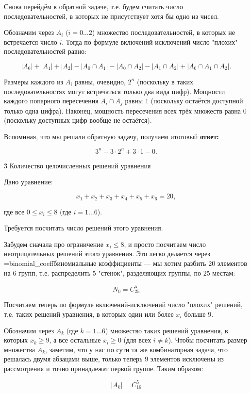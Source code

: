 Снова перейдём к обратной задаче, т.е. будем считать число последовательностей, в которых не присутствует хотя бы одно из чисел.

Обозначим через $A_i$ ($i = 0 \ldots 2$) множество последовательностей, в которых не встречается число $i$. Тогда по формуле включений-исключений число "плохих" последовательностей равно:

$$ |A_0| + |A_1| + |A_2| - |A_0 \cap A_1| - |A_0 \cap A_2| - |A_1 \cap A_2| + |A_0 \cap A_1 \cap A_2|. $$

Размеры каждого из $A_i$ равны, очевидно, $2^n$ (поскольку в таких последовательностях могут встречаться только два вида цифр). Мощности каждого попарного пересечения $A_i \cap A_j$ равны $1$ (поскольку остаётся доступной только одна цифра). Наконец, мощность пересечения всех трёх множеств равна $0$ (поскольку доступных цифр вообще не остаётся).

Вспоминая, что мы решали обратную задачу, получаем итоговый \bf{ответ}:

$$ 3^n - 3 \cdot 2^n + 3 \cdot 1 - 0. $$


\h3{ Количество целочисленных решений уравнения }

Дано уравнение:

$$ x_1 + x_2 + x_3 + x_4 + x_5 + x_6 = 20, $$

где все $0 \le x_i \le 8$ (где $i = 1 \ldots 6$).

Требуется посчитать число решений этого уравнения.

Забудем сначала про ограничение $x_i \le 8$, и просто посчитаем число неотрицательных решений этого уравнения. Это легко делается через \algohref=binomial_coeff{биномиальные коэффициенты} --- мы хотим разбить $20$ элементов на $6$ групп, т.е. распределить $5$ "стенок", разделяющих группы, по $25$ местам:

$$ N_0 = C_{25}^5 $$

Посчитаем теперь по формуле включений-исключений число "плохих" решений, т.е. таких решений уравнения, в которых один или более $x_i$ больше $9$.

Обозначим через $A_k$ (где $k = 1 \ldots 6$) множество таких решений уравнения, в которых $x_k \ge 9$, а все остальные $x_i \ge 0$ (для всех $i \ne k$). Чтобы посчитать размер множества $A_k$, заметим, что у нас по сути та же комбинаторная задача, что решалась двумя абзацами выше, только теперь $9$ элементов исключены из рассмотрения и точно принадлежат первой группе. Таким образом:

$$ | A_k | = C_{16}^5 $$

